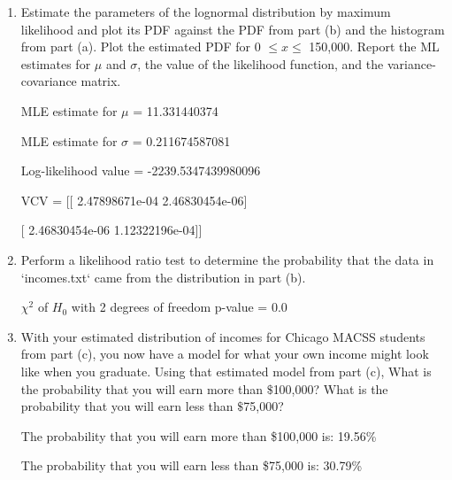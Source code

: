 \documentclass[letterpaper,12pt]{article}
\theoremstyle{definition}
\begin{document}
\begin{enumerate}
\begin{enumerate}
\item Estimate the parameters of the lognormal distribution by maximum likelihood and plot its PDF against the PDF from part (b) and the histogram from part (a). Plot the estimated PDF for 0 $\leq x \leq$ 150,000. Report the ML estimates for $\mu$ and $\sigma$, the value of the likelihood function, and the variance-covariance matrix.
\par
\begin{figure}[H]\centering\captionsetup{width=4.0in}
\end{figure}
\par
MLE estimate for $\mu$ = 11.331440374 \par
MLE estimate for $\sigma$ = 0.211674587081 \par
Log-likelihood value = -2239.5347439980096 \par
VCV =  [[  2.47898671e-04   2.46830454e-06] \par
\hspace{12mm} [  2.46830454e-06   1.12322196e-04]]
\par\bigskip

\item Perform a likelihood ratio test to determine the probability that the data in `incomes.txt` came from the distribution in part (b).
\par\bigskip
$\chi^2$ of $H_{0}$ with 2 degrees of freedom p-value =  0.0
\par\bigskip

\item With your estimated distribution of incomes for Chicago MACSS students from part (c), you now have a model for what your own income might look like when you graduate. Using that estimated model from part (c), What is the probability that you will earn more than $\$$100,000? What is the probability that you will earn less than $\$$75,000?
\par\bigskip
The probability that you will earn more than \$100,000 is: 19.56\%
\par
The probability that you will earn less than \$75,000 is: 30.79\%
\par\bigskip
\end{enumerate}


\end{enumerate}
\end{document}
